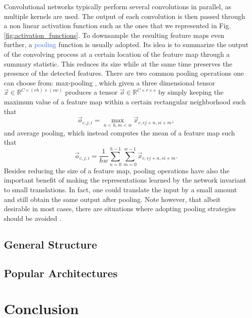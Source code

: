 Convolutional networks typically perform several convolutions in parallel, as multiple kernels are used. The output of each convolution is then passed through a non linear activation function such as the ones that we represented in Fig. \ref{fig:activation_functions}. To downsample the resulting feature maps even further, a \textcolor{RoyalBlue}{pooling} function is usually adopted. Its idea is to summarize the output of the convolving process at a certain location of the feature map through a summary statistic. This reduces its size while at the same time preserves the presence of the detected features. There are two common pooling operations one can choose from: max-pooling \cite{zhou1988computation}, which given a three dimensional tensor $\vec{x}\in\mathds{R}^{C\times(rh)\times(sw)}$ produces a tensor $\vec{o}\in\mathds{R}^{C\times r\times s}$ by simply keeping the maximum value of a feature map within a certain rectangular neighborhood such that 
\begin{equation}
	\vec{o}_{c,j,i} = \underset{n<h,m<w}{\max} \vec{x}_{c,rj+n,si+m},
\end{equation}
and average pooling, which instead computes the mean of a feature map such that 
\begin{equation}
	\vec{o}_{c,j,i} = \frac{1}{hw} \sum_{n=0}^{h-1}\sum_{m=0}^{w-1} \vec{x}_{c,rj+n,si+m}.
\end{equation}
Besides reducing the size of a feature map, pooling operations have also the important benefit of making the representations learned by the network invariant to small translations. In fact, one could translate the input by a small amount and still obtain the same output after pooling. Note however, that albeit desirable in most cases, there are situations where adopting pooling strategies should be avoided \cite{sabatelli2018learning, bidoiadeep}.  


\subsection{General Structure}
\label{sec:general_structure}

\subsection{Popular Architectures}
\label{sec:architectures}


\section{Conclusion}
\label{sec:conclusion01}
